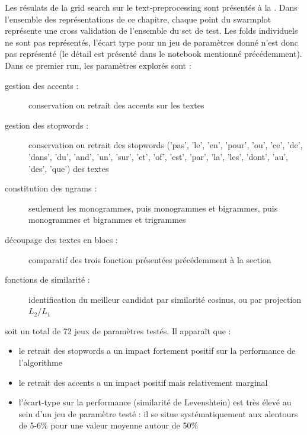             Les résulats de la grid search sur le text-preprocessing sont présentés à la .
            Dans l'ensemble des représentations de ce chapitre, chaque point du swarmplot représente une cross validation de l'ensemble du set de test.
            Les folds individuels ne sont pas représentés, l'écart type pour un jeu de paramètres donné n'est donc pas représenté (le détail est présenté dans le notebook mentionné précédemment).
            Dans ce premier run, les paramètres explorés sont : 
            \begin{description}
                \item[gestion des accents :] conservation ou retrait des accents sur les textes
                \item[gestion des stopwords :] conservation ou retrait des stopwords ('pas', 'le', 'en', 'pour', 'ou', 'ce', 'de', 'dans', 'du', 'and', 'un', 'sur', 'et', 'of', 'est', 'par', 'la', 'les', 'dont', 'au', 'des', 'que') des textes
                \item[constitution des ngrams :] seulement les monogrammes, puis monogrammes et bigrammes, puis monogrammes et bigrammes et trigrammes
                \item[découpage des textes en blocs :] comparatif des trois fonction présentées précédemment à la section 
                \item[fonctions de similarité :] identification du meilleur candidat par similarité cosinus, ou par projection $L_{2}/L_{1}$
            \end{description}
            soit un total de 72 jeux de paramètres testés.
            Il apparaît que :
            \begin{itemize}
                \item le retrait des stopwords a un impact fortement positif sur la performance de l'algorithme
                \item le retrait des accents a un impact positif mais relativement marginal
                \item l'écart-type sur la performance (similarité de Levenshtein) est très élevé au sein d'un jeu de paramètre testé : il se situe systématiquement aux alentours de 5-6\% pour une valeur moyenne autour de 50\%
            \end{itemize}

